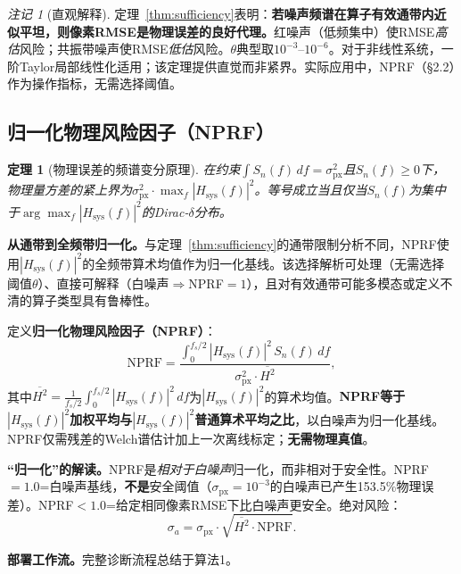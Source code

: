 \documentclass[9pt,twocolumn]{article}
\newtheorem{theorem}[proposition]{定理}
\theoremstyle{remark}
\newtheorem{remark}[proposition]{注记}
\theoremstyle{definition}
\newcommand{\pxrmse}{\sigma_{\text{px}}}
\newcommand{\nprf}{\text{NPRF}}
\newcommand{\snf}{S_n(f)}
\newcommand{\hsysf}{|H_{\text{sys}}(f)|^2}
\newcommand{\Hsqmean}{\overline{H^2}}
\newcommand{\澔}{%
  \hbox{%
    \scalebox{0.75}[1]{氵}%
    \kern -0.3em%
    \scalebox{0.8}[1]{皓}%
  }%
}
\begin{document}
\begin{remark}[直观解释]
定理~\ref{thm:sufficiency}表明：\textbf{若噪声频谱在算子有效通带内近似平坦，则像素RMSE是物理误差的良好代理。}红噪声（低频集中）使RMSE\textit{高估}风险；共振带噪声使RMSE\textit{低估}风险。$\theta$典型取$10^{-3}$--$10^{-6}$。对于非线性系统，一阶Taylor局部线性化适用；该定理提供直觉而非紧界。实际应用中，NPRF（\S 2.2）作为操作指标，无需选择阈值。
\end{remark}

\subsection{归一化物理风险因子（NPRF）}

\begin{theorem}[物理误差的频谱变分原理]
\label{thm:variational}
在约束$\int \snf \, df = \pxrmse^2$且$\snf \geq 0$下，物理量方差的紧上界为$\pxrmse^2 \cdot \max_f \hsysf$。等号成立当且仅当$\snf$为集中于$\arg\max_f \hsysf$的Dirac-$\delta$分布。
\end{theorem}

\textbf{从通带到全频带归一化。}与定理~\ref{thm:sufficiency}的通带限制分析不同，NPRF使用$\hsysf$的全频带算术均值作为归一化基线。该选择解析可处理（无需选择阈值$\theta$）、直接可解释（白噪声$\Rightarrow$NPRF$=1$），且对有效通带可能多模态或定义不清的算子类型具有鲁棒性。

定义\textbf{归一化物理风险因子（NPRF）}：
\begin{equation}
\label{eq:nprf_def}
\nprf = \frac{\int_{0}^{f_s/2} \hsysf \,\snf \, df}{\pxrmse^2 \cdot \Hsqmean},
\end{equation}
其中$\Hsqmean = \frac{1}{f_s/2}\int_{0}^{f_s/2} \hsysf \, df$为$\hsysf$的算术均值。\textbf{NPRF等于$\hsysf$加权平均与$\hsysf$普通算术平均之比}，以白噪声为归一化基线。NPRF仅需残差的Welch谱估计\cite{welch1967}加上一次离线标定；\textbf{无需物理真值}。

\textbf{“归一化”的解读。}NPRF是\textit{相对于白噪声}归一化，而非相对于安全性。NPRF$=1.0$=白噪声基线，\textbf{不是}安全阈值（$\sigma_{\text{px}}=10^{-3}$的白噪声已产生153.5\%物理误差）。NPRF$<1.0$=给定相同像素RMSE下比白噪声更安全。绝对风险：
\begin{equation}
\label{eq:decomposition}
\sigma_a = \pxrmse \cdot \sqrt{\Hsqmean \cdot \nprf}.
\end{equation}

\textbf{部署工作流。}完整诊断流程总结于算法1。
\end{document}
